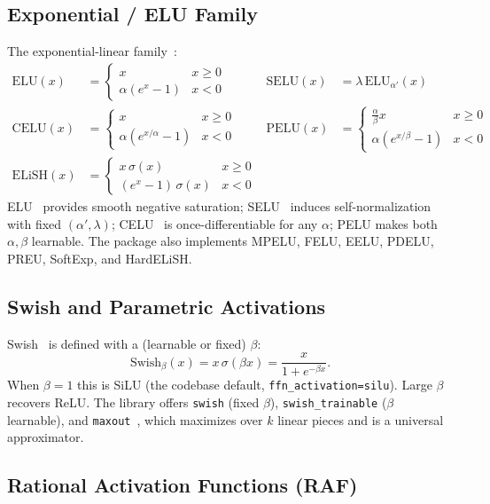 \subsection{Exponential / ELU Family}

The exponential-linear family~\citep{clevert2016elu,klambauer2017selu,dubey2021activations}:
\begin{align*}
\text{ELU}(x) &= \begin{cases} x & x\ge0 \\ \alpha(e^{x}-1) & x<0 \end{cases} &
\text{SELU}(x) &= \lambda\,\text{ELU}_{\alpha'}(x) \\
\text{CELU}(x) &= \begin{cases} x & x\ge0 \\ \alpha(e^{x/\alpha}-1) & x<0 \end{cases} &
\text{PELU}(x) &= \begin{cases} \tfrac{\alpha}{\beta}x & x\ge0 \\ \alpha(e^{x/\beta}-1) & x<0 \end{cases} \\
\text{ELiSH}(x) &= \begin{cases} x\,\sigma(x) & x\ge0 \\ (e^{x}-1)\,\sigma(x) & x<0 \end{cases}
\end{align*}
ELU~\citep{clevert2016elu} provides smooth negative saturation; SELU~\citep{klambauer2017selu}
induces self-normalization with fixed $(\alpha',\lambda)$; CELU~\citep{barron2017celu} is
once-differentiable for any $\alpha$; PELU makes both $\alpha,\beta$ learnable. The package also
implements MPELU, FELU, EELU, PDELU, PREU, SoftExp, and HardELiSH.

\subsection{Swish and Parametric Activations}

Swish~\citep{ramachandran2017swish} is defined with a (learnable or fixed)
$\beta$:
\[
\text{Swish}_\beta(x) = x\,\sigma(\beta x) = \frac{x}{1+e^{-\beta x}}.
\]
When $\beta=1$ this is SiLU (the codebase default, \texttt{ffn\_activation=silu}).
Large $\beta$ recovers ReLU. The library offers \texttt{swish} (fixed $\beta$),
\texttt{swish\_trainable} ($\beta$ learnable), and \texttt{maxout}~\citep{goodfellow2013maxout},
which maximizes over $k$ linear pieces and is a universal approximator.

\subsection{Rational Activation Functions (RAF)}
\label{sec:raf}

